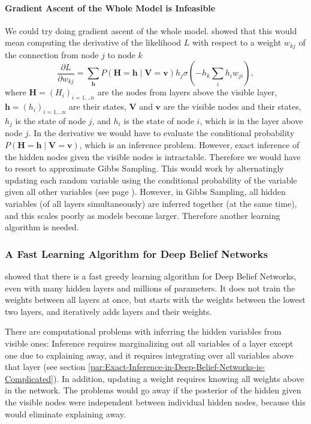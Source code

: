 \paragraph{Gradient Ascent of the Whole Model is Infeasible}

We could try doing gradient ascent of the whole model. \cite{Neal1992}
showed that this would mean computing the derivative of the likelihood
$L$ with respect to a weight $w_{kj}$ of the connection from node
$j$ to node $k$ 
\[
\frac{\partial L}{\partial w_{kj}}=\sum_{\mathbf{h}}P(\mathbf{H}=\mathbf{h}\mid\mathbf{V}=\mathbf{v})h_{j}\sigma\left(-h_{k}\sum_{i}h_{i}w_{ji}\right),
\]
 where $\mathbf{H}=(H_{i})_{i=1,..n}$ are the nodes from layers above
the visible layer, $\mathbf{h}=(h_{i})_{i=1,..n}$ are their states,
$\mathbf{V}$ and $\mathbf{v}$ are the visible nodes and their states,
$h_{j}$ is the state of node $j$, and $h_{i}$ is the state of node
$i$, which is in the layer above node $j$. In the derivative we
would have to evaluate the conditional probability $P(\mathbf{H}=\mathbf{h}\mid\mathbf{V}=\mathbf{v})$,
which is an inference problem. However, exact inference of the hidden
nodes given the visible nodes is intractable. Therefore we would have
to resort to approximate Gibbs Sampling. This would work by alternatingly
updating each random variable using the conditional probability of
the variable given all other variables (see page \pageref{par:Gibbs-Sampling-in-Markov-Random-Fields}).
However, in Gibbs Sampling, all hidden variables (of all layers simultaneously)
are inferred together (at the same time), and this scales poorly as
models become larger. Therefore another learning algorithm is needed.

\subsubsection{A Fast Learning Algorithm for Deep Belief Networks\label{subsec:A-Fast-Learning-Algorithm-for-Deep-Belief-Networks}}

\cite{HintonTeh2006} showed that there is a fast greedy learning
algorithm for Deep Belief Networks, even with many hidden layers and
millions of parameters. It does not train the weights between all
layers at once, but starts with the weights between the lowest two
layers, and iteratively adds layers and their weights.

There are computational problems with inferring the hidden variables
from visible ones: Inference requires marginalizing out all variables
of a layer except one due to explaining away, and it requires integrating
over all variables above that layer (see section \ref{par:Exact-Inference-in-Deep-Belief-Networks-is-Complicated}).
In addition, updating a weight requires knowing all weights above
in the network. The problems would go away if the posterior of the
hidden given the visible nodes were independent between individual
hidden nodes, because this would eliminate explaining away.

